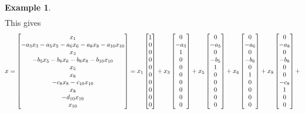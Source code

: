 \documentclass[reqno]{amsart}
\theoremstyle{definition}
\newtheorem{example}[theorem]{Example}
\begin{document}
\begin{example}
\[\begin{array}{ccccccccc}
 \end{array}\]
 This gives
 \[ x =
     \left[\begin{matrix} x_1 \\
          -a_3x_3-a_5x_5-a_6x_6-a_8x_8-a_{10}x_{10} \\
          x_3 \\
          -b_5x_5-b_6x_6-b_8x_8-b_{10}x_{10} \\
          x_5 \\
          x_6 \\
          -c_8x_8-c_{10}x_{10} \\
          x_8 \\
          -d_{10}x_{10} \\
          x_{10}
     \end{matrix}\right]
     =
     x_1 \left[\begin{matrix} 1 \\   0     \\  0  \\ 0       \\  0  \\  0  \\ 0       \\  0  \\ 0       \\  0  \end{matrix}\right] +
     x_3 \left[\begin{matrix} 0 \\ -a_3    \\  1  \\ 0       \\  0  \\  0  \\ 0       \\  0  \\ 0       \\  0  \end{matrix}\right] +
     x_5 \left[\begin{matrix} 0 \\ -a_5    \\  0  \\ -b_5    \\  1  \\  0  \\ 0       \\  0  \\ 0       \\  0  \end{matrix}\right] +
     x_6 \left[\begin{matrix} 0 \\ -a_6    \\  0  \\ -b_6    \\  0  \\  1  \\ 0       \\  0  \\ 0       \\  0  \end{matrix}\right] +
     x_8 \left[\begin{matrix} 0 \\ -a_8    \\  0  \\ -b_8    \\  0  \\  0  \\ -c_8    \\  1  \\ 0       \\  0  \end{matrix}\right] +
\]
\end{example}
\end{document}
